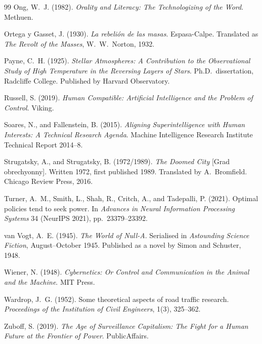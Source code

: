 \documentclass[12pt, oneside]{book}
\theoremstyle{plain}
\theoremstyle{definition}
\theoremstyle{remark}
\theoremstyle{definition}
\begin{document}
\begin{thebibliography}{99}
Ong, W.\ J. (1982). \textit{Orality and Literacy: The Technologizing of the Word}.
Methuen.

Ortega y Gasset, J. (1930). \textit{La rebeli\'{o}n de las masas}. Espasa-Calpe.
Translated as \textit{The Revolt of the Masses}, W.\ W.\ Norton, 1932.

Payne, C.\ H. (1925). \textit{Stellar Atmospheres: A Contribution to the
Observational Study of High Temperature in the Reversing Layers of Stars}.
Ph.D.\ dissertation, Radcliffe College. Published by Harvard Observatory.

Russell, S. (2019). \textit{Human Compatible: Artificial Intelligence and the
Problem of Control}. Viking.

Soares, N., and Fallenstein, B. (2015). \textit{Aligning Superintelligence with
Human Interests: A Technical Research Agenda}. Machine Intelligence Research
Institute Technical Report 2014--8.

Strugatsky, A., and Strugatsky, B. (1972/1989). \textit{The Doomed City} [Grad
obrechyonny]. Written 1972, first published 1989. Translated by A.\ Bromfield.
Chicago Review Press, 2016.

Turner, A.\ M., Smith, L., Shah, R., Critch, A., and Tadepalli, P. (2021).
Optimal policies tend to seek power. In \textit{Advances in Neural Information
Processing Systems} 34 (NeurIPS 2021), pp.\ 23379--23392.

van Vogt, A.\ E. (1945). \textit{The World of Null-A}. Serialised in
\textit{Astounding Science Fiction}, August--October 1945. Published as a novel
by Simon and Schuster, 1948.

Wiener, N. (1948). \textit{Cybernetics: Or Control and Communication in the Animal
and the Machine}. MIT Press.

Wardrop, J.\ G. (1952). Some theoretical aspects of road traffic research.
\textit{Proceedings of the Institution of Civil Engineers}, 1(3), 325--362.

Zuboff, S. (2019). \textit{The Age of Surveillance Capitalism: The Fight for a
Human Future at the Frontier of Power}. PublicAffairs.

\end{thebibliography}
\end{document}
